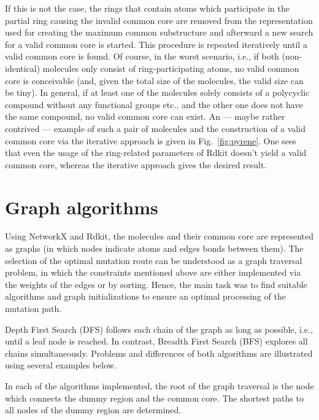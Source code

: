 If this is not the case, the rings that contain atoms which participate in the partial ring causing the invalid common core are removed from the representation used for creating the maximum common substructure and afterward a new search for a valid common core is started. This procedure is repeated iteratively until a valid common core is found.
Of course, in the worst scenario, i.e., if both (non-identical) molecules only consist of ring-participating atoms, no valid common core is conceivable (and, given the total size of the molecules, the valid size can be tiny). In general, if at least one of the molecules solely consists of a polycyclic compound without any functional groups etc., and the other one does not have the same compound, no valid common core can exist. 
An --- maybe rather contrived --- example of such a pair of molecules and the construction of a valid common core via the iterative approach is given in Fig.~\ref{fig:pyrene}. One sees that even the usage of the ring-related parameters of Rdkit doesn't yield a valid common core, whereas the iterative approach gives the desired result.



\section{Graph algorithms}

Using NetworkX and Rdkit, the molecules and their common core are
represented as graphs (in which nodes indicate atoms and edges bonds
between them). The selection of the optimal mutation route can be
understood as a graph traversal problem, in which the constraints mentioned
above are either implemented via the weights of the edges or by sorting.
Hence, the main task was to find suitable algorithms and graph initializations
to ensure an optimal processing of the mutation path.

Depth First Search (DFS) follows each chain of the graph as long as
possible, i.e., until a leaf node is reached. In contrast, Breadth
First Search (BFS) explores all chains simultaneously.\cite{Even.2012}
Problems and differences of both algorithms are illustrated using
several examples below.

In each of the algorithms implemented, the root of the graph traversal is the node which connects the dummy region and the common core.
The shortest paths to all nodes of the dummy region are determined.

